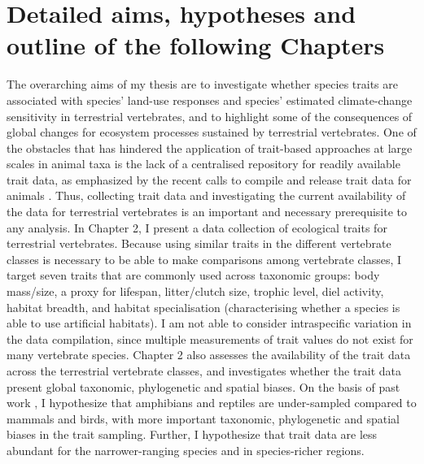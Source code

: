 \section{Detailed aims, hypotheses and outline of the following Chapters}

The overarching aims of my thesis are to investigate whether species traits are associated with species' land-use responses and species' estimated climate-change sensitivity in terrestrial vertebrates, and to highlight some of the consequences of global changes for ecosystem processes sustained by terrestrial vertebrates. One of the obstacles that has hindered the application of trait-based approaches at large scales in animal taxa is the lack of a centralised repository for readily available trait data, as emphasized by the recent calls to compile and release trait data for animals \citep{Kissling2018, Junker2022}. Thus, collecting trait data and investigating the current availability of the data for terrestrial vertebrates is an important and necessary prerequisite to any analysis. In Chapter 2, I present  a data collection of ecological traits for terrestrial vertebrates. Because using similar traits in the different vertebrate classes is necessary to be able to make comparisons among vertebrate classes, I target seven traits that are commonly used across taxonomic groups: body mass/size, a proxy for lifespan, litter/clutch size, trophic level, diel activity, habitat breadth, and habitat specialisation (characterising whether a species is able to use artificial habitats). I am not able to consider intraspecific variation in the data compilation, since multiple measurements of trait values do not exist for many vertebrate species. Chapter 2 also assesses the availability of the trait data across the terrestrial vertebrate classes, and investigates whether the trait data present global taxonomic, phylogenetic and spatial biases. On the basis of past work \citep{Titley2017}, I hypothesize that amphibians and reptiles are under-sampled compared to mammals and birds, with more important taxonomic, phylogenetic and spatial biases in the trait sampling. Further, I hypothesize that trait data are less abundant for the narrower-ranging species and in species-richer regions. 

